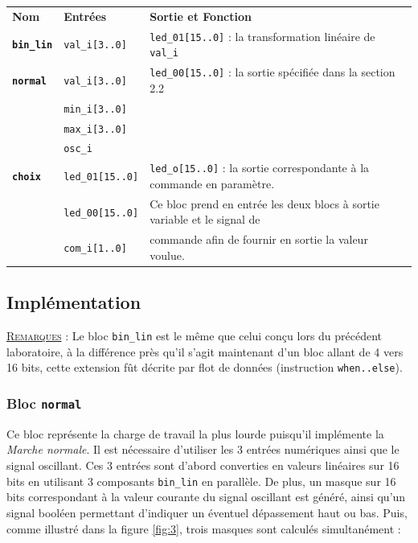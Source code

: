 \begin{center}

\begin{tabular}{lll}
\textbf{Nom }& \textbf{Entrées} & \textbf{Sortie et Fonction} \\
\textbf{\texttt{bin\_lin}} & \texttt{val\_i[3..0]}& \texttt{led\_01[15..0]} : la transformation linéaire de \texttt{val\_i} \\
\hline
\textbf{\texttt{normal}} & \texttt{val\_i[3..0] }& \texttt{led\_00[15..0]} : la sortie spécifiée dans la section 2.2\\ 
& \texttt{min\_i[3..0]} & \\ 
& \texttt{max\_i[3..0]} & \\
& \texttt{osc\_i} & \\
\hline
\textbf{\texttt{choix}} & \texttt{led\_01[15..0]} &  \texttt{led\_o[15..0]} : la sortie correspondante à la commande en paramètre. \\
& \texttt{led\_00[15..0]} & Ce bloc prend en entrée les deux blocs à sortie variable et le signal de\\
& \texttt{com\_i[1..0]} &  commande afin de fournir en sortie la valeur voulue. \\
\end{tabular}

\end{center}


\subsection{Implémentation}

\textsc{\underline{Remarques} :} Le bloc \texttt{bin\_lin} est le même que celui conçu lors du précédent laboratoire, à la différence près qu'il s'agit maintenant d'un bloc allant de 4 vers 16 bits, cette extension fût décrite par flot de données (instruction \lstinline{when..else}).

\subsubsection{Bloc \texttt{normal}}

Ce bloc représente la charge de travail la plus lourde puisqu'il implémente la \textit{Marche normale}. Il est nécessaire d'utiliser les 3 entrées numériques ainsi que le signal oscillant. Ces 3 entrées sont d'abord converties en valeurs linéaires sur 16 bits en utilisant 3 composants \texttt{bin\_lin} en parallèle. De plus, un masque sur 16 bits correspondant à la valeur courante du signal oscillant est généré, ainsi qu'un signal booléen permettant d'indiquer un éventuel dépassement haut ou bas. Puis, comme illustré dans la figure \ref{fig:3}, trois masques sont calculés simultanément : 

